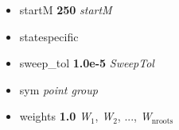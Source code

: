 \documentclass[letterpaper,10pt,english]{sphinxmanual}
\begin{document}
\begin{itemize}
\item {} 
startM \textbf{250} \emph{\textbar{}\textbar{} startM}

\item {} 
statespecific

\item {} 
sweep\_tol \textbf{1.0e-5} \emph{\textbar{}\textbar{} SweepTol}

\item {} 
sym \emph{point group}

\item {} 
weights \textbf{1.0} \emph{\textbar{}\textbar{}} \emph{W}$_{\text{1}}$, \emph{W}$_{\text{2}}$, ..., \emph{W}$_{\text{nroots}}$

\end{itemize}



\renewcommand{\indexname}{Index}
\printindex
\end{document}
